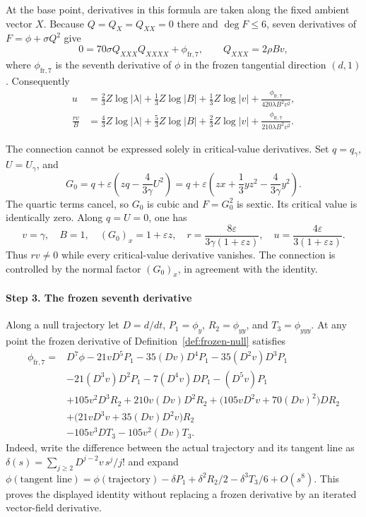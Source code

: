 \documentclass[11pt]{amsart}
\theoremstyle{definition}
\theoremstyle{remark}
\numberwithin{equation}{section}
\begin{document}
At the base point, derivatives in this formula are taken along the fixed ambient vector $X$. Because $Q=Q_X=Q_{XX}=0$ there and $\deg F\le6$, seven derivatives of $F=\phi+\sigma Q^2$ give
\[
0=70\sigma Q_{XXX}Q_{XXXX}+\phi_{\mathrm{fr},7},
\qquad Q_{XXX}=2\rho Bv,
\]
where $\phi_{\mathrm{fr},7}$ is the seventh derivative of $\phi$ in the frozen tangential direction $(d,1)$. Consequently
\begin{equation}\label{low:6:s36cg:sextic-connection}
\begin{aligned}
u&=\frac23Z\log|\lambda|+\frac13Z\log|B|+\frac13Z\log|v|+\frac{\phi_{\mathrm{fr},7}}{420\lambda B^2v^2},\\
\frac{rv}{B}&=\frac43Z\log|\lambda|+\frac53Z\log|B|+\frac23Z\log|v|+\frac{\phi_{\mathrm{fr},7}}{210\lambda B^2v^2}.
\end{aligned}
\end{equation}

The connection cannot be expressed solely in critical-value derivatives. Set $q=q_\gamma$, $U=U_\gamma$, and
\[
G_0=q+\varepsilon\left(zq-\frac{4}{3\gamma}U^2\right)
=q+\varepsilon\left(zx+\frac13yz^2-\frac{4}{3\gamma}y^2\right).
\]
The quartic terms cancel, so $G_0$ is cubic and $F=G_0^2$ is sextic. Its critical value is identically zero. Along $q=U=0$, one has
\[
v=\gamma,\quad B=1,\quad (G_0)_x=1+\varepsilon z,\quad r=\frac{8\varepsilon}{3\gamma(1+\varepsilon z)},\quad u=\frac{4\varepsilon}{3(1+\varepsilon z)}.
\]
Thus $rv\ne0$ while every critical-value derivative vanishes. The connection is controlled by the normal factor $(G_0)_x$, in agreement with the identity.

\paragraph{Step 3. The frozen seventh derivative}\label{low:6:s36cg:frozen-seven}

Along a null trajectory let $D=d/dt$, $P_1=\phi_y$, $R_2=\phi_{yy}$, and $T_3=\phi_{yyy}$. At any point the frozen derivative of Definition~\ref{def:frozen-null} satisfies
\begin{align*}
\phi_{\mathrm{fr},7}={}&D^7\phi-21vD^5P_1-35(Dv)D^4P_1-35(D^2v)D^3P_1\\
&-21(D^3v)D^2P_1-7(D^4v)DP_1-(D^5v)P_1\\
&+105v^2D^3R_2+210v(Dv)D^2R_2+\bigl(105vD^2v+70(Dv)^2\bigr)DR_2\\
&+\bigl(21vD^3v+35(Dv)D^2v\bigr)R_2\\
&-105v^3DT_3-105v^2(Dv)T_3.
\end{align*}
Indeed, write the difference between the actual trajectory and its tangent line as $\delta(s)=\sum_{j\ge2}D^{j-2}v\,s^j/j!$ and expand $\phi(\text{tangent line})=\phi(\text{trajectory})-\delta P_1+\delta^2R_2/2-\delta^3T_3/6+O(s^8)$. This proves the displayed identity without replacing a frozen derivative by an iterated vector-field derivative.
\end{document}
